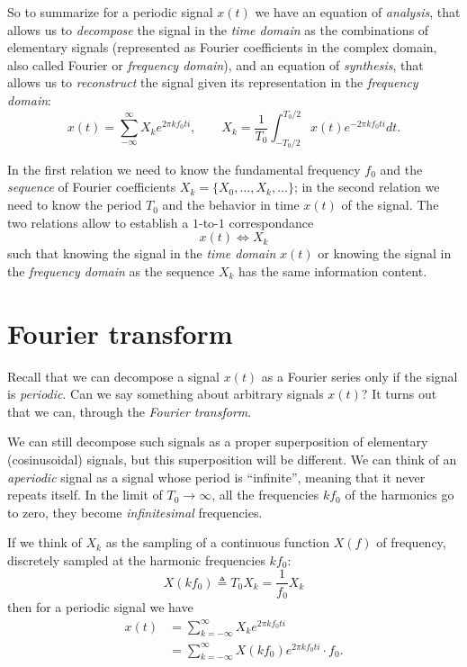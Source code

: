 So to summarize for a periodic signal $x(t)$ we have an equation of \emph{analysis}, that allows us to \emph{decompose} the signal in the \emph{time domain} as the combinations of elementary signals (represented as Fourier coefficients in the complex domain, also called Fourier or \emph{frequency domain}), and an equation of \emph{synthesis}, that allows us to \emph{reconstruct} the signal given its representation in the \emph{frequency domain}:
\begin{equation}
    x(t) = \sum_{-\infty}^{\infty} X_k e^{2 \pi k f_0 t i}, \qquad X_k = \frac{1}{T_0} \int_{-T_0/2}^{T_0 / 2} x(t) e^{- 2\pi k f_0 t i} dt.
\end{equation}

In the first relation we need to know the fundamental frequency $f_0$ and the \emph{sequence} of Fourier coefficients $X_k = \{X_0, \dots, X_k, \dots\}$; in the second relation we need to know the period $T_0$ and the behavior in time $x(t)$ of the signal. The two relations allow to establish a $1$-to-$1$ correspondance 
\begin{equation}
    x(t) \iff X_k
\end{equation}
such that knowing the signal in the \emph{time domain} $x(t)$ or knowing the signal in the \emph{frequency domain} as the sequence $X_k$ has the same information content.


\section{Fourier transform}

Recall that we can decompose a signal $x(t)$ as a Fourier series only if the signal is \emph{periodic}. Can we say something about arbitrary signals $x(t)$? It turns out that we can, through the \emph{Fourier transform}.

We can still decompose such signals as a proper superposition of elementary (cosinusoidal) signals, but this superposition will be different. We can think of an \emph{aperiodic} signal as a signal whose period is ``infinite'', meaning that it never repeats itself. In the limit of $T_0 \to \infty$, all the frequencies $k f_0$ of the harmonics go to zero, they become \emph{infinitesimal} frequencies.

If we think of $X_k$ as the sampling of a continuous function $X(f)$ of frequency, discretely sampled at the harmonic frequencies $k f_0$:
\begin{equation}
    X(k f_0) \triangleq T_0 X_k = \frac{1}{f_0} X_k
\end{equation}
then for a periodic signal we have
\begin{equation}
    \begin{aligned}
        x(t) & = \sum_{k = -\infty}^{\infty} X_k e^{2 \pi k f_0 t i } \\
        & = \sum_{k = -\infty}^{\infty} X(k f_0) e^{2 \pi k f_0 t i } \cdot f_0.
    \end{aligned}
\end{equation}

